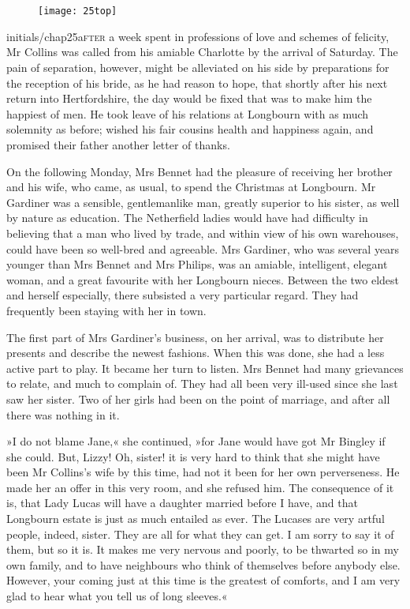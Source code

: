 \chapter[Chapter \thechapter]{}
	
\begin{figure}[t!]
	\centering
\texttt{[image: 25top]}
\end{figure}


\lettrine[lines=6,image=true]{initials/chap25a}{fter}  a week spent in professions of love and schemes of felicity, Mr Collins was called from his amiable Charlotte by the arrival of Saturday. The pain of separation, however, might be alleviated on his side by preparations for the reception of his bride, as he had reason to hope, that shortly after his next return into Hertfordshire, the day would be fixed that was to make him the happiest of men. He took leave of his relations at Longbourn with as much solemnity as before; wished his fair cousins health and happiness again, and promised their father another letter of thanks.

On the following Monday, Mrs Bennet had the pleasure of receiving her brother and his wife, who came, as usual, to spend the Christmas at Longbourn. Mr Gardiner was a sensible, gentlemanlike man, greatly superior to his sister, as well by nature as education. The Netherfield ladies would have had difficulty in believing that a man who lived by trade, and within view of his own warehouses, could have been so well-bred and agreeable. Mrs Gardiner, who was several years younger than Mrs Bennet and Mrs Philips, was an amiable, intelligent, elegant woman, and a great favourite with her Longbourn nieces. Between the two eldest and herself especially, there subsisted a very particular regard. They had frequently been staying with her in town.

The first part of Mrs Gardiner's business, on her arrival, was to distribute her presents and describe the newest fashions. When this was done, she had a less active part to play. It became her turn to listen. Mrs Bennet had many grievances to relate, and much to complain of. They had all been very ill-used since she last saw her sister. Two of her girls had been on the point of marriage, and after all there was nothing in it.

»I do not blame Jane,« she continued, »for Jane would have got Mr Bingley if she could. But, Lizzy! Oh, sister! it is very hard to think that she might have been Mr Collins's wife by this time, had not it been for her own perverseness. He made her an offer in this very room, and she refused him. The consequence of it is, that Lady Lucas will have a daughter married before I have, and that Longbourn estate is just as much entailed as ever. The Lucases are very artful people, indeed, sister. They are all for what they can get. I am sorry to say it of them, but so it is. It makes me very nervous and poorly, to be thwarted so in my own family, and to have neighbours who think of themselves before anybody else. However, your coming just at this time is the greatest of comforts, and I am very glad to hear what you tell us of long sleeves.«

